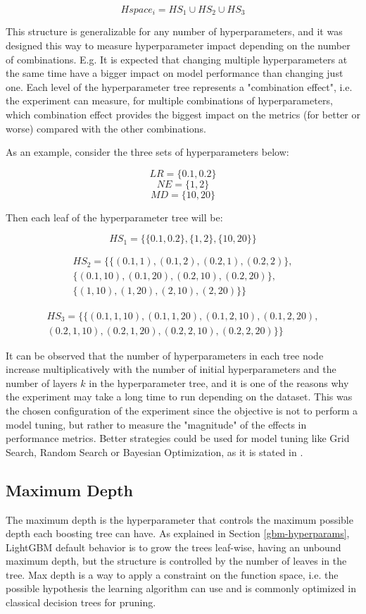 $$Hspace_i = HS_1 \cup HS_2 \cup HS_3$$

This structure is generalizable for any number of hyperparameters, and it was designed this way to measure hyperparameter impact depending on the number of combinations. E.g. It is expected that changing multiple hyperparameters at the same time have a bigger impact on model performance than changing just one. Each level of the hyperparameter tree represents a "combination effect", i.e. the experiment can measure, for multiple combinations of hyperparameters, which combination effect provides the biggest impact on the metrics (for better or worse) compared with the other combinations.

As an example, consider the three sets of hyperparameters below:

$$LR = \{0.1, 0.2\}$$
$$NE = \{1, 2\}$$
$$MD = \{10, 20\}$$

Then each leaf of the hyperparameter tree will be:

$$HS_1 = \Big\{\{0.1, 0.2\}, \{1, 2\}, \{10, 20\}\Big\}$$

\begin{align*}
    HS_2 = \Big\{\{(0.1, 1), (0.1, 2), (0.2, 1), (0.2, 2)\}, \\
            \{(0.1, 10), (0.1, 20), (0.2, 10), (0.2, 20)\}, \\
            \{(1, 10), (1, 20), (2, 10), (2, 20)\}\Big\}
\end{align*}

\begin{align*}
    HS_3 = \Big\{\{(0.1, 1, 10), (0.1, 1, 20), (0.1, 2, 10), (0.1, 2, 20), \\
    (0.2, 1, 10), (0.2, 1, 20), (0.2, 2, 10), (0.2, 2, 20)\}\Big\}
\end{align*}

It can be observed that the number of hyperparameters in each tree node increase multiplicatively with the number of initial hyperparameters and the number of layers $k$ in the hyperparameter tree, and it is one of the reasons why the experiment may take a long time to run depending on the dataset. This was the chosen configuration of the experiment since the objective is not to perform a model tuning, but rather to measure the "magnitude" of the effects in performance metrics. Better strategies could be used for model tuning like Grid Search, Random Search or Bayesian Optimization, as it is stated in \cite{probst2018tunability}.

\subsection{Maximum Depth}
\label{subsec:max-depth}
The maximum depth is the hyperparameter that controls the maximum possible depth each boosting tree can have. As explained in Section \ref{gbm-hyperparams}, LightGBM default behavior is to grow the trees leaf-wise, having an unbound maximum depth, but the structure is controlled by the number of leaves in the tree. Max depth is a way to apply a constraint on the function space, i.e. the possible hypothesis the learning algorithm can use and is commonly optimized in classical decision trees for pruning. 


